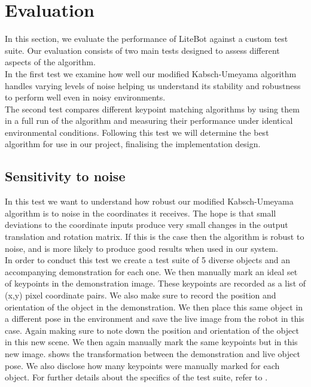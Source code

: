 \chapter{Evaluation}
\label{chap:evaluation}
In this section, we evaluate the performance of LiteBot against a custom test suite. Our evaluation consists of two main tests designed to assess different aspects of the algorithm.\\
In the first test we examine how well our modified Kabsch-Umeyama algorithm handles varying levels of noise helping us understand its stability and robustness to perform well even in noisy environments.\\
The second test compares different keypoint matching algorithms by using them in a full run of the algorithm and measuring their performance under identical environmental conditions. Following this test we will determine the best algorithm for use in our project, finalising the implementation design.

\section{Sensitivity to noise}
\label{sec:noise-test}
In this test we want to understand how robust our modified Kabsch-Umeyama algorithm is to noise in the coordinates it receives. The hope is that small deviations to the coordinate inputs produce very small changes in the output translation and rotation matrix. If this is the case then the algorithm is robust to noise, and is more likely to produce good results when used in our system.\\

In order to conduct this test we create a test suite of 5 diverse objects and an accompanying demonstration for each one. We then manually mark an ideal set of keypoints in the demonstration image. These keypoints are recorded as a list of (x,y) pixel coordinate pairs. We also make sure to record the position and orientation of the object in the demonstration. We then place this same object in a different pose in the environment and save the live image from the robot in this case. Again making sure to note down the position and orientation of the object in this new scene. We then again manually mark the same keypoints but in this new image.  shows the transformation between the demonstration and live object pose. We also disclose how many keypoints were manually marked for each object. For further details about the specifics of the test suite, refer to .\\

